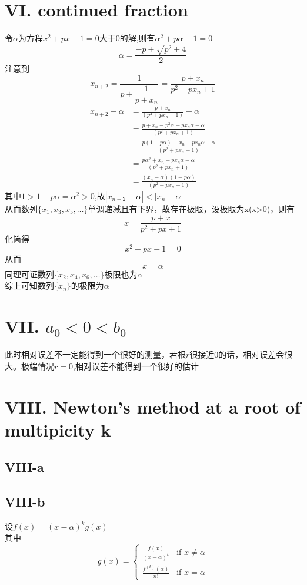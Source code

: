 \documentclass[a4paper]{article}
\begin{document}
\section*{VI. continued fraction}
令$\alpha$为方程$x^2 + px -1 = 0$大于0的解,则有$\alpha^2 + p\alpha -1 = 0$\\
\[\alpha =  \frac{-p + \sqrt{p^2+4}}{2}
\]
注意到
\[
x_{n+2} = \frac{1}{p + \dfrac{1}{p + x_n}}= \frac{p + x_n}{p^2 + px_n + 1}
\]
\begin{align*}
  x_{n+2} - \alpha &= \frac{p + x_n}{\left(p^2 + px_n + 1\right)} - \alpha \\
  &= \frac{p + x_n - p^2\alpha - px_n\alpha - \alpha}{\left(p^2 + px_n + 1\right)}\\
  &= \frac{p(1 - p\alpha) + x_n- px_n\alpha - \alpha}{\left(p^2 + px_n + 1\right)}\\
  &= \frac{p\alpha^2 + x_n- px_n\alpha - \alpha}{\left(p^2 + px_n + 1\right)}\\
  &= \frac{(x_n - \alpha)(1-p\alpha)}{\left(p^2 + px_n + 1\right)}  
\end{align*}
其中$1 > 1 - p\alpha = \alpha^2 > 0$,故$|x_{n+2} - \alpha| < |x_n - \alpha|$\\
从而数列$\{x_1, x_3, x_5, \dots \}$单调递减且有下界，故存在极限，设极限为x(x>0)，则有
\[
  x = \frac{p + x}{p^2 + px + 1}
\]
化简得
\[
  x^2 + px -1 = 0
\]
从而\[x = \alpha\]
同理可证数列$\{x_2, x_4, x_6, \dots \}$极限也为$\alpha$\\
综上可知数列$\{x_n\}$的极限为$\alpha$

\section*{VII. $a_0 < 0 < b_0$}
此时相对误差不一定能得到一个很好的测量，若根$r$很接近0的话，相对误差会很大。极端情况$r = 0$,相对误差不能得到一个很好的估计 

\section*{VIII. Newton's method at a root of multipicity k}
\subsection*{VIII-a}
\subsection*{VIII-b}
设$f(x) = (x - \alpha)^k g(x)$\\
其中\[g(x)=
\begin{cases}
  \frac{f(x)}{(x-\alpha)^k} &\text{if } x \neq \alpha\\
  \frac{f^{(k)}(\alpha)}{n!}&\text{if } x = \alpha
\end{cases}
\] 
\end{document}
